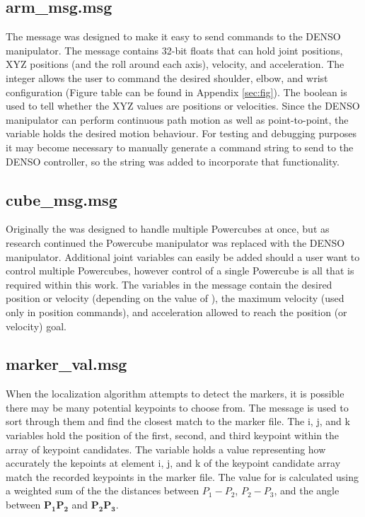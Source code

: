 \subsection{arm\_msg.msg}
The  message was designed to make it easy to send commands to the DENSO manipulator. The message contains 32-bit floats that can hold joint positions, XYZ positions (and the roll around each axis), velocity, and acceleration. The  integer allows the user to command the desired shoulder, elbow, and wrist configuration (Figure table can be found in Appendix \ref{sec:fig}). The  boolean is used to tell  whether the XYZ values are positions or velocities. Since the DENSO manipulator can perform continuous path motion as well as point-to-point, the  variable holds the desired motion behaviour. For testing and debugging purposes it may become necessary to manually generate a command string to send to the DENSO controller, so the string  was added to incorporate that functionality.\\

\subsection{cube\_msg.msg}
Originally the  was designed to handle multiple Powercubes at once, but as research continued the Powercube manipulator was replaced with the DENSO manipulator. Additional joint variables can easily be added should a user want to control multiple Powercubes, however control of a single Powercube is all that is required within this work. The variables in the  message contain the desired position or velocity (depending on the value of ), the maximum velocity (used only in position commands), and acceleration allowed to reach the position (or velocity) goal.\\

\subsection{marker\_val.msg}
When the localization algorithm attempts to detect the markers, it is possible there may be many potential keypoints to choose from. The  message is used to sort through them and find the closest match to the marker file. The i, j, and k variables hold the position of the first, second, and third keypoint within the array of keypoint candidates. The  variable holds a value representing how accurately the kepoints at element i, j, and k of the keypoint candidate array match the recorded keypoints in the marker file. The value for  is calculated using a weighted sum of the the distances between $P_1-P_2$, $P_2-P_3$, and the angle between $\mathbf{P_1P_2}$ and $\mathbf{P_2P_3}$. \\

